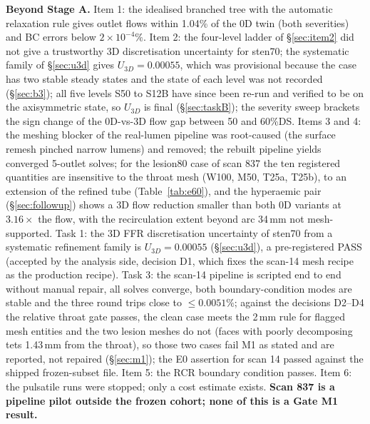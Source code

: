 \documentclass[11pt]{article}
\begin{document}
\textbf{Beyond Stage A.} Item 1: the idealised branched tree with the automatic relaxation rule gives outlet flows within 1.04\% of the 0D twin (both severities) and BC errors below $2\times10^{-4}\%$. Item 2: the four-level ladder of \S\ref{sec:item2} did not give a trustworthy 3D discretisation uncertainty for sten70; the systematic family of \S\ref{sec:u3d} gives $U_{3D}=0.00055$, which was provisional because the case has two stable steady states and the state of each level was not recorded (\S\ref{sec:b3}); all five levels S50 to S12B have since been re-run and verified to be on the axisymmetric state, so $U_{3D}$ is final (\S\ref{sec:taskB}); the severity sweep brackets the sign change of the 0D-vs-3D flow gap between 50 and 60\%DS. Items 3 and 4: the meshing blocker of the real-lumen pipeline was root-caused (the surface remesh pinched narrow lumens) and removed; the rebuilt pipeline yields converged 5-outlet solves; for the lesion80 case of scan 837 the ten registered quantities are insensitive to the throat mesh (W100, M50, T25a, T25b), to an extension of the refined tube (Table~\ref{tab:e60}), and the hyperaemic pair (\S\ref{sec:followup}) shows a 3D flow reduction smaller than both 0D variants at $3.16\times$ the flow, with the recirculation extent beyond arc 34\,mm not mesh-supported. Task 1: the 3D FFR discretisation uncertainty of sten70 from a systematic refinement family is $U_{3D}=0.00055$ (\S\ref{sec:u3d}), a pre-registered PASS (accepted by the analysis side, decision D1, which fixes the scan-14 mesh recipe as the production recipe). Task 3: the scan-14 pipeline is scripted end to end without manual repair, all solves converge, both boundary-condition modes are stable and the three round trips close to $\leq0.0051\%$; against the decisions D2--D4 the relative throat gate passes, the clean case meets the 2\,mm rule for flagged mesh entities and the two lesion meshes do not (faces with poorly decomposing tets 1.43\,mm from the throat), so those two cases fail M1 as stated and are reported, not repaired (\S\ref{sec:m1}); the E0 assertion for scan 14 passed against the shipped frozen-subset file. Item 5: the RCR boundary condition passes. Item 6: the pulsatile runs were stopped; only a cost estimate exists. \textbf{Scan 837 is a pipeline pilot outside the frozen cohort; none of this is a Gate M1 result.}
\end{document}
